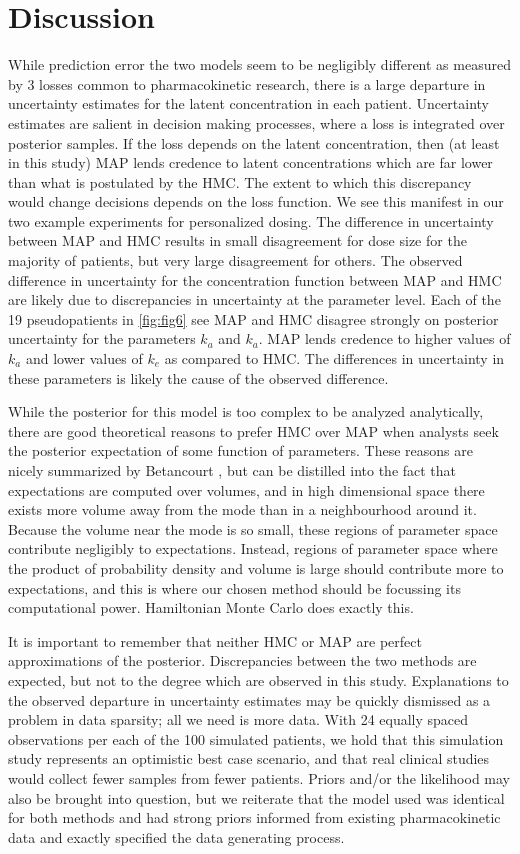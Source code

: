 \section{Discussion}

While prediction error the two models seem to be negligibly different as measured by 3 losses common to pharmacokinetic research, there is a large departure in uncertainty estimates for the latent concentration in each patient.  Uncertainty estimates are salient in decision making processes, where a loss is integrated over posterior samples.  If the loss depends on the latent concentration, then (at least in this study) MAP lends credence to latent concentrations which are far lower than what is postulated by the HMC.  The extent to which this discrepancy would change decisions depends on the loss function. We see this manifest in our two example experiments for personalized dosing.  The difference in uncertainty between MAP and HMC results in small disagreement for dose size for the majority of patients, but very large disagreement for others. The observed difference in uncertainty for the concentration function between MAP and HMC are likely due to discrepancies in uncertainty at the parameter level. Each of the 19 pseudopatients in \cref{fig:fig6} see MAP and HMC disagree strongly on posterior uncertainty for the parameters $k_a$ and $k_a$.  MAP lends credence to higher values of $k_a$ and lower values of $k_e$ as compared to HMC. The differences in uncertainty in these parameters is likely the cause of the observed difference.

While the posterior for this model is too complex to be analyzed analytically, there are good theoretical reasons to prefer HMC over MAP when analysts seek the posterior expectation of some function of parameters. These reasons are nicely summarized by Betancourt \cite{Betancourt2017-ak}, but can be distilled into the fact that expectations are computed over volumes, and in high dimensional space there exists more volume away from the mode than in a neighbourhood around it. Because the volume near the mode is so small, these regions of parameter space contribute negligibly to expectations.  Instead, regions of parameter space where the product of probability density and volume is large should contribute more to expectations, and this is where our chosen method should be focussing its computational power.  Hamiltonian Monte Carlo does exactly this.

It is important to remember that neither HMC or MAP are perfect approximations of the posterior.  Discrepancies between the two methods are expected, but not to the degree which are observed in this study.  Explanations to the observed departure in uncertainty estimates may be quickly dismissed as a problem in data sparsity; all we need is more data.  With 24 equally spaced observations per each of the 100 simulated patients, we hold that this simulation study represents an optimistic best case scenario, and that real clinical studies would collect fewer samples from fewer patients.  Priors and/or the likelihood may also be brought into question, but we reiterate that the model used was identical for both methods and had strong priors informed from existing pharmacokinetic data and exactly specified the data generating process.

